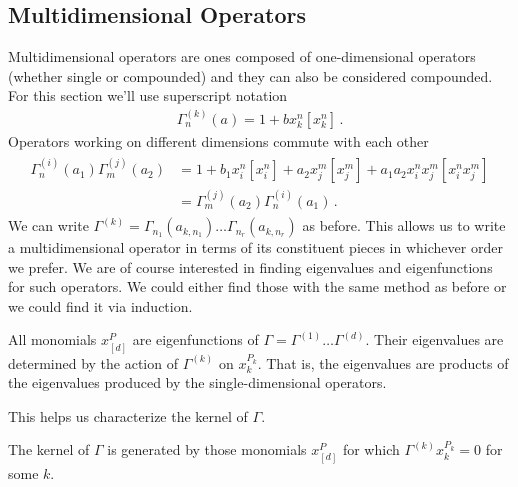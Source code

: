 \subsection{Multidimensional Operators}
Multidimensional operators are ones composed of one-dimensional operators (whether single or compounded) and they can also be considered compounded. For this section we'll use superscript notation
\begin{align}
	\Gamma_n^{(k)}(a) = 1 + bx_k^n[x_k^n]\,.
\end{align}
Operators working on different dimensions commute with each other
\begin{align}\begin{split}
	\Gamma_n^{(i)}(a_1)\Gamma_m^{(j)}(a_2)&= 1  +b_1x_i^n[x_i^n]+a_2x_j^m[x_j^m] + a_1a_2x_i^nx_j^m[x_i^n x_j^m]\\
	&= \Gamma_m^{(j)}(a_2)\Gamma_n^{(i)}(a_1)\,.
\end{split}\end{align}
We can write $\Gamma^{(k)} = \Gamma_{n_1}(a_{k,n_1})\ldots\Gamma_{n_r}(a_{k,n_r})$ as before. This allows us to write a multidimensional operator in terms of its constituent pieces in whichever order we prefer. We are of course interested in finding eigenvalues and eigenfunctions for such operators. We could either find those with the same method as before or we could find it via induction.
\begin{prop} All monomials $x_{[d]}^P$ are eigenfunctions of $\Gamma = \Gamma^{(1)}\ldots\Gamma^{(d)}$. Their eigenvalues are determined by the action of $\Gamma^{(k)}$ on $x_k^{P_k}$. That is, the eigenvalues are products of the eigenvalues produced by the single-dimensional operators.
\end{prop}
This helps us characterize the kernel of $\Gamma$.
\begin{corollary} The kernel of $\Gamma$ is generated by those monomials $x_{[d]}^P$ for which $\Gamma^{(k)}x_k^{P_k} = 0$ for some $k$.
\end{corollary}

